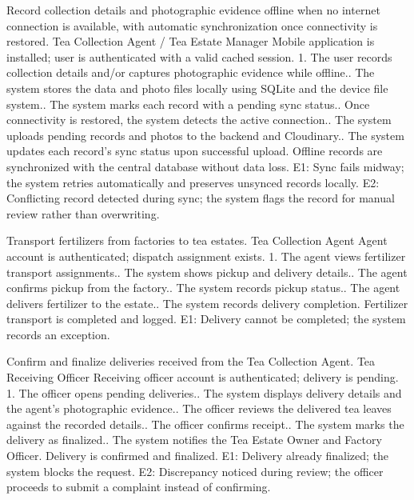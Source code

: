 {Record collection details and photographic evidence offline when no internet connection is available, with automatic synchronization once connectivity is restored.}
{Tea Collection Agent / Tea Estate Manager}
{Mobile application is installed; user is authenticated with a valid cached session.}
{1. The user records collection details and/or captures photographic evidence while offline.. The system stores the data and photo files locally using SQLite and the device file system.. The system marks each record with a pending sync status.. Once connectivity is restored, the system detects the active connection.. The system uploads pending records and photos to the backend and Cloudinary.. The system updates each record's sync status upon successful upload.}
{Offline records are synchronized with the central database without data loss.}
{E1: Sync fails midway; the system retries automatically and preserves unsynced records locally.\newline
E2: Conflicting record detected during sync; the system flags the record for manual review rather than overwriting.}

{Transport fertilizers from factories to tea estates.}
{Tea Collection Agent}
{Agent account is authenticated; dispatch assignment exists.}
{1. The agent views fertilizer transport assignments.. The system shows pickup and delivery details.. The agent confirms pickup from the factory.. The system records pickup status.. The agent delivers fertilizer to the estate.. The system records delivery completion.}
{Fertilizer transport is completed and logged.}
{E1: Delivery cannot be completed; the system records an exception.}

{Confirm and finalize deliveries received from the Tea Collection Agent.}
{Tea Receiving Officer}
{Receiving officer account is authenticated; delivery is pending.}
{1. The officer opens pending deliveries.. The system displays delivery details and the agent's photographic evidence.. The officer reviews the delivered tea leaves against the recorded details.. The officer confirms receipt.. The system marks the delivery as finalized.. The system notifies the Tea Estate Owner and Factory Officer.}
{Delivery is confirmed and finalized.}
{E1: Delivery already finalized; the system blocks the request.\newline
E2: Discrepancy noticed during review; the officer proceeds to submit a complaint instead of confirming.}

